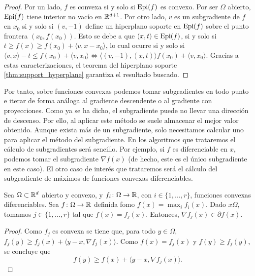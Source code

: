 \begin{proof}
    Por un lado, $f$ es convexa si y solo si $\operatorname{Epi}(f)$ es convexo. Por ser $\Omega$ abierto, $\operatorname{Epi}(f)$ tiene interior no vacío en $\mathbb{R}^{d+1}$. Por otro lado, $v$ es un subgradiente de $f$ en $x_0$ si y solo si $(v,-1)$ define un hiperplano soporte en $\operatorname{Epi}(f)$ sobre el punto frontera $(x_0,f(x_0))$. Esto se debe a que $(x,t) \in \operatorname{Epi}(f)$, si y solo si $t \ge f(x) \ge f(x_0) + \langle v, x - x_0 \rangle$, lo cual ocurre si y solo si $\langle v,x \rangle - t \le f(x_0) + \langle v, x_0 \rangle \iff \langle (v,-1),(x,t) \rangle f(x_0) + \langle v,x_0 \rangle$. Gracias a estas caracterizaciones, el teorema del hiperplano soporte \ref{thm:support_hyperplane} garantiza el resultado buscado.
\end{proof}

Por tanto, sobre funciones convexas podemos tomar subgradientes en todo punto e iterar de forma análoga al gradiente descendente o al gradiente con proyecciones. Como ya se ha dicho, el subgradiente puede no llevar una dirección de descenso. Por ello, al aplicar este método se suele almacenar el mejor valor obtenido. Aunque exista más de un subgradiente, solo necesitamos calcular uno para aplicar el método del subgradiente. En los algoritmos que trataremos el cálculo de subgradientes será sencillo. Por ejemplo, si $f$ es diferenciable en $x$, podemos tomar el subgradiente $\nabla f(x)$ (de hecho, este es el único subgradiente en este caso). El otro caso de interés que trataremos será el cálculo del subgradiente de máximos de funciones convexas diferenciables.

\begin{prop}
    Sea $\Omega \subset \mathbb{R}^d$ abierto y convexo, y $f_i\colon \Omega \to \mathbb{R}$, con $i\in \{1,\dots,r\}$, funciones convexas diferenciables. Sea $f \colon \Omega \to \mathbb{R}$ definida fomo $f(x) = \max_i f_i(x)$. Dado $x \Omega$, tomamos $j \in \{1,\dots,r\}$ tal que $f(x) = f_j(x)$. Entonces, $\nabla f_j(x) \in \partial f(x)$.
\end{prop}

\begin{proof}
    Como $f_j$ es convexa se tiene que, para todo $y \in \Omega$, $f_j(y) \ge f_j(x) + \langle y-x, \nabla f_j(x) \rangle$. Como $f(x) = f_j(x)$ y $f(y) \ge f_j(y)$, se concluye que
    \[ f(y) \ge f(x) + \langle y-x, \nabla f_j(x) \rangle. \]
\end{proof}